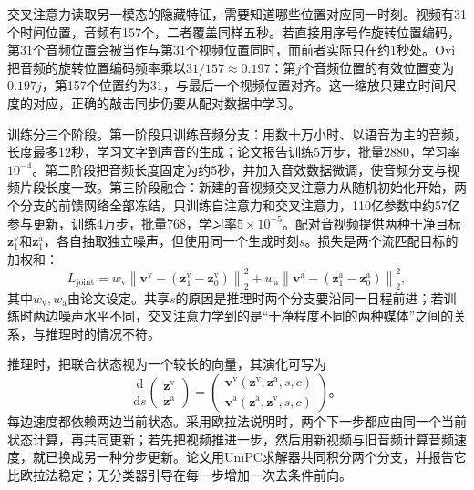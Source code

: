 交叉注意力读取另一模态的隐藏特征，需要知道哪些位置对应同一时刻。视频有31个时间位置，音频有157个，二者覆盖同样五秒。若直接用序号作旋转位置编码，第31个音频位置会被当作与第31个视频位置同时，而前者实际只在约1秒处。Ovi把音频的旋转位置编码频率乘以$31/157\approx0.197$：第$j$个音频位置的有效位置变为$0.197j$，第157个位置约为31，与最后一个视频位置对齐。这一缩放只建立时间尺度的对应，正确的敲击同步仍要从配对数据中学习。

训练分三个阶段。第一阶段只训练音频分支：用数十万小时、以语音为主的音频，长度最多12秒，学习文字到声音的生成；论文报告训练5万步，批量2880，学习率$10^{-4}$。第二阶段把音频长度固定为约5秒，并加入音效数据微调，使音频分支与视频片段长度一致。第三阶段融合：新建的音视频交叉注意力从随机初始化开始，两个分支的前馈网络全部冻结，只训练自注意力和交叉注意力，110亿参数中约57亿参与更新，训练4万步，批量768，学习率$5\times10^{-5}$。配对音视频提供两种干净目标$\bm z_1^{\mathrm v}$和$\bm z_1^{\mathrm a}$，各自抽取独立噪声，但使用同一个生成时刻$s$。损失是两个流匹配目标的加权和：
\begin{equation}
  L_{\mathrm{joint}}
  =w_{\mathrm v}\left\lVert\bm v^{\mathrm v}-(\bm z_1^{\mathrm v}-\bm z_0^{\mathrm v})\right\rVert_2^2
   +w_{\mathrm a}\left\lVert\bm v^{\mathrm a}-(\bm z_1^{\mathrm a}-\bm z_0^{\mathrm a})\right\rVert_2^2,
  \label{eq:vision-ovi-objective}
\end{equation}
其中$w_{\mathrm v},w_{\mathrm a}$由论文设定。共享$s$的原因是推理时两个分支要沿同一日程前进；若训练时两边噪声水平不同，交叉注意力学到的是“干净程度不同的两种媒体”之间的关系，与推理时的情况不符。

推理时，把联合状态视为一个较长的向量，其演化可写为
\begin{equation}
 \frac{\mathrm d}{\mathrm ds}
 \begin{pmatrix}\bm z^{\mathrm v}\\ \bm z^{\mathrm a}\end{pmatrix}
 =
 \begin{pmatrix}
 \bm v^{\mathrm v}(\bm z^{\mathrm v},\bm z^{\mathrm a},s,c)\\
 \bm v^{\mathrm a}(\bm z^{\mathrm a},\bm z^{\mathrm v},s,c)
 \end{pmatrix}\text{。}
 \label{eq:vision-joint-flow}
\end{equation}
每边速度都依赖两边当前状态。采用欧拉法说明时，两个下一步都应由同一个当前状态计算，再共同更新；若先把视频推进一步，然后用新视频与旧音频计算音频速度，就已换成另一种分步更新。论文用UniPC求解器共同积分两个分支，并报告它比欧拉法稳定；无分类器引导在每一步增加一次去条件前向。


